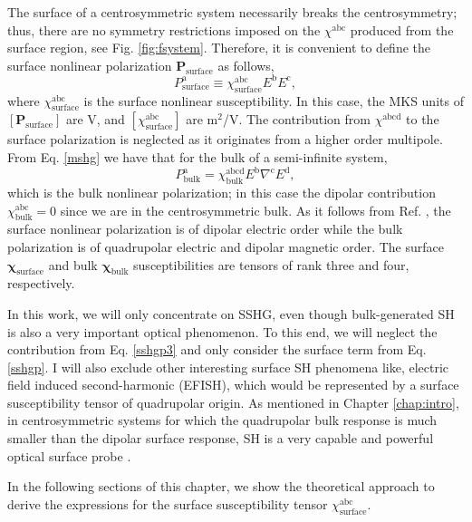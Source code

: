 The surface of a centrosymmetric system necessarily breaks the centrosymmetry;
thus, there are no symmetry restrictions imposed on the $\chi^{\mathrm{abc}}$
produced from the surface region, see Fig. \ref{fig:fsystem}. Therefore, it is
convenient to define the surface nonlinear polarization
$\mathbf{P}_{\mathrm{surface}}$ as follows,
\begin{equation}\label{sshgp}
P^{\mathrm{a}}_{\mathrm{surface}}
\equiv \chi^{\mathrm{abc}}_{\mathrm{surface}}E^{\mathrm{b}}E^{\mathrm{c}},
\end{equation}
where $\chi^{\mathrm{abc}}_{\mathrm{surface}}$ is the surface nonlinear
susceptibility. In this case, the MKS units of $[\mathbf{P}_{\mathrm{surface}}]$
are V, and $[\chi^{\mathrm{abc}}_{\mathrm{surface}}]$ are m$^{2}$/V. The
contribution from $\chi^{\mathrm{abcd}}$ to the surface polarization is
neglected as it originates from a higher order multipole. From Eq. \eqref{mshg}
we have that for the bulk of a semi-infinite system,
\begin{equation}\label{sshgp3}
P^{\mathrm{a}}_{\mathrm{bulk}}
= \chi^{\mathrm{abcd}}_{\mathrm{bulk}}
  E^{\mathrm{b}}\nabla^{\mathrm{c}}E^{\mathrm{d}},  
\end{equation}
which is the bulk nonlinear polarization; in this case the dipolar contribution
$\chi^{\mathrm{abc}}_{\mathrm{bulk}} = 0$ since we are in the centrosymmetric
bulk. As it follows from Ref. \cite{bloembergenPR62}, the surface nonlinear
polarization is of dipolar electric order while the bulk polarization is of
quadrupolar electric and dipolar magnetic order. The surface
$\boldsymbol{\chi}_{\mathrm{surface}}$ and bulk
$\boldsymbol{\chi}_{\mathrm{bulk}}$ susceptibilities are tensors of rank
three and four, respectively.

In this work, we will only concentrate on SSHG, even though bulk-generated SH is
also a very important optical phenomenon. To this end, we will neglect the
contribution from Eq. \eqref{sshgp3} and only consider the surface term from Eq.
\eqref{sshgp}. I will also exclude other interesting surface SH phenomena like,
electric field induced second-harmonic (EFISH), which would be represented by a
surface susceptibility tensor of quadrupolar origin. As mentioned in Chapter
\ref{chap:intro}, in centrosymmetric systems for which the quadrupolar bulk
response is much smaller than the dipolar surface response, SH is a very capable
and powerful optical surface probe \cite{downerSIA01}.

In the following sections of this chapter, we show the theoretical
approach to derive the expressions for the surface susceptibility tensor
$\chi^{\mathrm{abc}}_{\mathrm{surface}}$.

